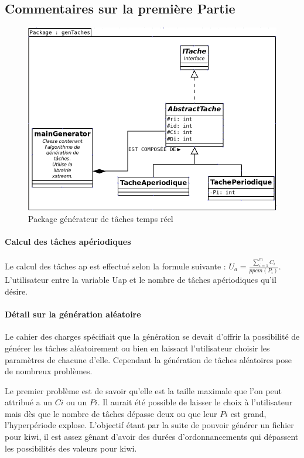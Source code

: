 \subsection{Commentaires sur la première Partie}
   \begin{figure}[htbp]
  \centering
  \includegraphics[scale=0.60]{img/packgen}
  \caption{Package générateur de tâches temps réel}
  \label{fig:gen}
\end{figure}

\paragraph{Calcul des tâches apériodiques} 
Le calcul des tâches ap est effectué selon la formule suivante : $ U_a =  \frac{\sum_{i=1}^m C_i}{ppcm(P_i)}$. L'utilisateur entre la variable Uap  et le nombre de tâches apériodiques qu'il désire. 
\paragraph{Détail sur la génération aléatoire}\label{PremPart}
Le cahier des charges spécifiait que la génération se devait d'offrir la possibilité de générer les tâches aléatoirement ou bien en laissant l'utilisateur choisir les paramètres de chacune d'elle. Cependant la génération de tâches aléatoires pose de nombreux problèmes.

Le premier problème est de savoir qu'elle est la taille maximale que l'on peut attribué a un $Ci$ ou un $Pi$. Il aurait été possible de laisser le choix à l'utilisateur mais dès que le nombre de tâches dépasse deux ou que leur $Pi$ est grand, l'hyperpériode explose. L'objectif étant par la suite de pouvoir générer un fichier pour kiwi, il est assez gênant d'avoir des durées d'ordonnancements qui dépassent les possibilités des valeurs pour kiwi.

